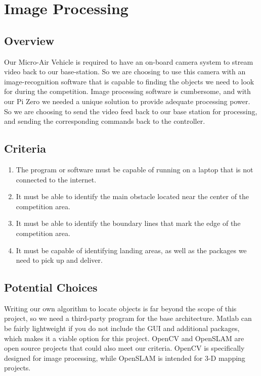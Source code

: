 \documentclass[onecolumn, draftclsnofoot,10pt, compsoc]{IEEEtran}
\begin{document}
\section{Image Processing}

\subsection{Overview}

Our Micro-Air Vehicle is required to have an on-board camera system 
to stream video back to our base-station. So we are choosing to use 
this camera with an image-recognition software that is capable to 
finding the objects we need to look for during the competition. 
Image processing software is cumbersome, and with our Pi Zero we 
needed a unique solution to provide adequate processing power. So 
we are choosing to send the video feed back to our base station for 
processing, and sending the corresponding commands back to the 
controller. 

\subsection{Criteria}

\begin{enumerate}
\item{The program or software must be capable of running on a 
laptop that is not connected to the internet.}

\item{It must be able to identify the main obstacle located near 
the center of the competition area.}

\item{It must be able to identify the boundary lines that mark the 
edge of the competition area.}

\item{It must be capable of identifying landing areas, as well as 
the packages we need to pick up and deliver. }
\end{enumerate}

\subsection{Potential Choices}

Writing our own algorithm to locate objects is far beyond the scope 
of this project, so we need a third-party program for the base 
architecture. Matlab can be fairly lightweight if you do not 
include the GUI and additional packages, which makes it a viable 
option for this project. OpenCV and OpenSLAM are open source 
projects that could also meet our criteria. OpenCV is specifically 
designed for image processing, while OpenSLAM is intended for 3-D 
mapping projects. 
\end{document}

